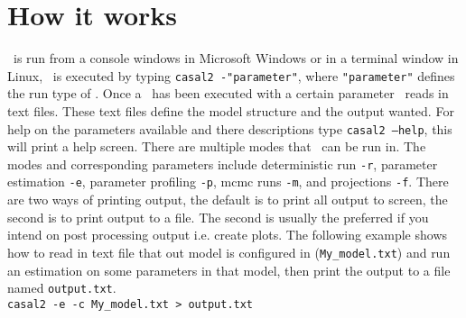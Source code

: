 \section{How it works}\label{sec:intro}
\CNAME\ is run from a console windows in Microsoft Windows or in a terminal window in Linux, \CNAME\ is executed by typing \texttt{casal2 -"parameter"}, where \texttt{"parameter"} defines the run type of \CNAME. Once a \CNAME\ has been executed with a certain parameter \CNAME\ reads in text files. These text files define the model structure and the output wanted. For help on the parameters available and there descriptions type \texttt{casal2 --help}, this will print a help screen. There are multiple modes that \CNAME\ can be run in. The modes and corresponding parameters include deterministic run \texttt{-r}, parameter estimation \texttt{-e}, parameter profiling \texttt{-p}, mcmc runs \texttt{-m}, and projections \texttt{-f}. There are two ways of printing output, the default is to print all output to screen, the second is to print output to a file. The second is usually the preferred if you intend on post processing output i.e. create plots. The following example shows how to read in text file that out model is configured in (\texttt{My\_model.txt}) and run an estimation on some parameters in that model, then print the output to a file named \texttt{output.txt}.\\

\texttt{casal2 -e  -c My\_model.txt > output.txt}

